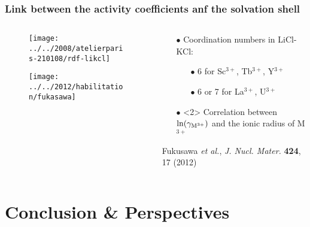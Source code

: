 \documentclass{beamer}
\begin{document}
\begin{frame}
   \frametitle{Link between the activity coefficients anf the solvation shell}
   \begin{columns}
      \begin{column}{6cm}
         \vspace{-0.5cm}
         \begin{figure}
            \texttt{[image: ../../2008/atelierparis-210108/rdf-likcl]}
         \end{figure}
         \vspace{-1cm}
         \begin{figure}
            \texttt{[image: ../../2012/habilitation/fukasawa]}
         \end{figure}
      \end{column}
      \begin{column}{6cm}
         \begin{itemize}
            \item[$\bullet$] Coordination numbers in LiCl-KCl:
                  \begin{itemize}
                     \item[$\bullet$] 6 for Sc$^{3+}$, Tb$^{3+}$, Y$^{3+}$
                     \item[$\bullet$] 6 or 7 for La$^{3+}$, U$^{3+}$
                  \end{itemize}
            \vspace{2cm}
            \item[$\bullet$]<2> Correlation between $\ln(\gamma_{{\rm M}^{3+}})$ and the ionic radius of M$^{3+}$
         \end{itemize}
            \vspace{2cm}
   {\scriptsize Fukusawa {\it et al.}, {\it J. Nucl. Mater.} {\bf 424}, 17 (2012)}
      \end{column}
   \end{columns}
\end{frame}

\section{Conclusion \& Perspectives}
\end{document}
